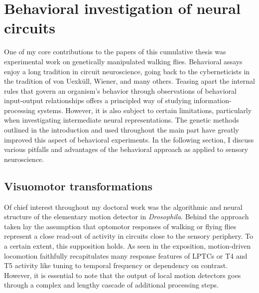 
\section{Behavioral investigation of neural circuits}

One of my core contributions to the papers of this cumulative thesis was experimental work on genetically manipulated walking flies. Behavioral assays enjoy a long tradition in circuit neuroscience, going back to the cyberneticists in the tradition of von Uexküll, Wiener, and many others. Teasing apart the internal rules that govern an organism's behavior through observations of behavioral input-output relationships offers a principled way of studying information-processing systems. However, it is also subject to certain limitations, particularly when investigating intermediate neural representations. The genetic methods outlined in the introduction and used throughout the main part have greatly improved this aspect of behavioral experiments. In the following section, I discuss various pitfalls and advantages of the behavioral approach as applied to sensory neuroscience.


\subsection{Visuomotor transformations}
Of chief interest throughout my doctoral work was the algorithmic and neural structure of the elementary motion detector in \textit{Drosophila}. Behind the approach taken lay the assumption that optomotor responses of walking or flying flies represent a close read-out of activity in circuits close to the sensory periphery. To a certain extent, this supposition holds. As seen in the exposition, motion-driven locomotion faithfully recapitulates many response features of LPTCs or T4 and T5 activity like tuning to temporal frequency or dependency on contrast. However, it is essential to note that the output of local motion detectors goes through a complex and lengthy cascade of additional processing steps.


